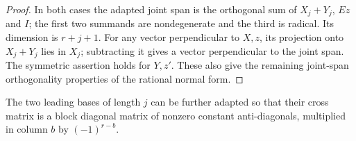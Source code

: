 \begin{proof}
In both cases the adapted joint span is the orthogonal
sum of \(X_j+Y_j\), \(Ez\) and \(I\); the first two
summands are nondegenerate and the third is radical.
Its dimension is \(r+j+1\). For any vector perpendicular
to \(X,z\), its projection onto \(X_j+Y_j\) lies in
\(X_j\); subtracting it gives a vector perpendicular
to the joint span. The symmetric assertion holds for
\(Y,z'\). These also give the remaining joint-span
orthogonality properties of the rational normal form.
\end{proof}

\begin{lemma}
\label{lem:rational-flag-signed-block}
The two leading bases of length \(j\) can be further
adapted so that their cross matrix is a block diagonal
matrix of nonzero constant anti-diagonals, multiplied
in column \(b\) by \((-1)^{r-b}\).
\end{lemma}
